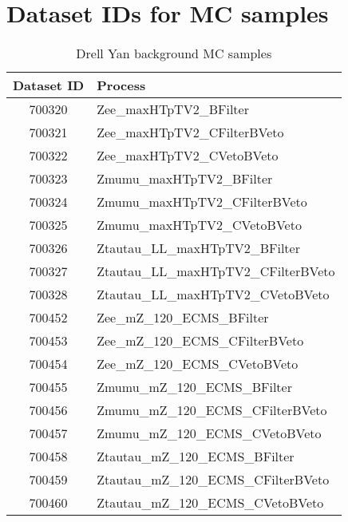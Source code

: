 \documentclass[12pt, a4paper]{book}
\begin{document}
\chapter{Dataset IDs for MC samples}\label{appendix:DSIDs}
\begin{table}[!h]
    \centering
    \caption{Drell Yan background MC samples}
    \begin{tabular}{c|l}\midrule\midrule
        Dataset ID              & Process\\\midrule
        700320                  & Zee\_maxHTpTV2\_BFilter\\
        700321                  & Zee\_maxHTpTV2\_CFilterBVeto\\
        700322                  & Zee\_maxHTpTV2\_CVetoBVeto\\
        700323                  & Zmumu\_maxHTpTV2\_BFilter\\
        700324                  & Zmumu\_maxHTpTV2\_CFilterBVeto\\
        700325                  & Zmumu\_maxHTpTV2\_CVetoBVeto\\
        700326                  & Ztautau\_LL\_maxHTpTV2\_BFilter\\
        700327                  & Ztautau\_LL\_maxHTpTV2\_CFilterBVeto\\
        700328                  & Ztautau\_LL\_maxHTpTV2\_CVetoBVeto\\
        700452                  & Zee\_mZ\_120\_ECMS\_BFilter\\
        700453                  & Zee\_mZ\_120\_ECMS\_CFilterBVeto\\
        700454                  & Zee\_mZ\_120\_ECMS\_CVetoBVeto\\
        700455                  & Zmumu\_mZ\_120\_ECMS\_BFilter\\
        700456                  & Zmumu\_mZ\_120\_ECMS\_CFilterBVeto\\
        700457                  & Zmumu\_mZ\_120\_ECMS\_CVetoBVeto\\
        700458                  & Ztautau\_mZ\_120\_ECMS\_BFilter\\
        700459                  & Ztautau\_mZ\_120\_ECMS\_CFilterBVeto\\
        700460                  & Ztautau\_mZ\_120\_ECMS\_CVetoBVeto \\\midrule\midrule
    \end{tabular}
    \label{tab:DY_DSID}
\end{table}
\end{document}
